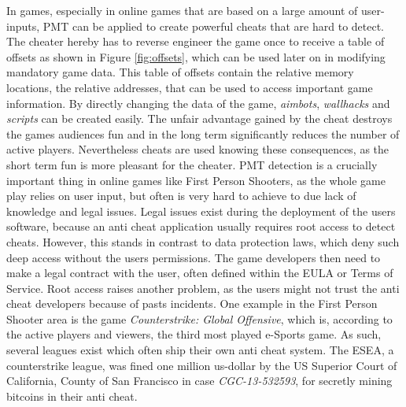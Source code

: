 
In games, especially in online games that are based on a large amount of user-inputs, \gls{PMT} can be applied to create powerful cheats that are hard to detect. The cheater hereby has to reverse engineer the game once to receive a table of offsets as shown in Figure \ref{fig:offsets}, which can be used later on in modifying mandatory game data. This table of offsets contain the relative memory locations, the relative addresses, that can be used to access important game information. By directly changing the data of the game, \emph{aimbots}, \emph{wallhacks} and \emph{scripts} can be created easily. The unfair advantage gained by the cheat destroys the games audiences fun and in the long term significantly reduces the number of active players. Nevertheless cheats are used knowing these consequences, as the short term fun is more pleasant for the cheater. \gls{PMT} detection is a crucially important thing in online games like First Person Shooters, as the whole game play relies on user input, but often is very hard to achieve to due lack of knowledge and legal issues. Legal issues exist during the deployment of the users software, because an anti cheat application usually requires root access to detect cheats. However, this stands in contrast to data protection laws, which deny such deep access without the users permissions. The game developers then need to make a legal contract with the user, often defined within the \gls{EULA} or Terms of Service. Root access raises another problem, as the users might not trust the anti cheat developers because of pasts incidents. One example in the First Person Shooter area is the game \emph{Counterstrike: Global Offensive}, which is, according to the active players and viewers, the third most played e-Sports game. As such, several leagues exist which often ship their own anti cheat system. The \gls{ESEA}, a counterstrike league, was fined one million us-dollar by the US Superior Court of California, County of San Francisco \cite{esea} in case \emph{CGC-13-532593}, for secretly mining bitcoins in their anti cheat. 